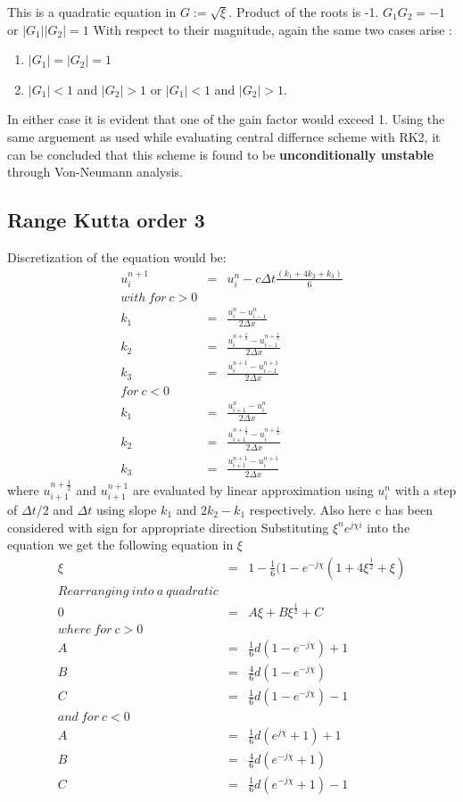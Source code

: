\documentclass[a4paper,12pt]{report}
\begin{document}
This is a quadratic equation in $G := \sqrt{\xi}$. Product of the roots is -1. \newline
$G_1G_2 = -1$ or $|G_1||G_2| = 1$
With respect to their magnitude, again the same two cases arise :
\begin{enumerate}
\item $|G_1|=|G_2|=1$
\item $|G_1|<1$ and $|G_2|> 1$ or $|G_1|<1$ and $|G_2|> 1$. 
\end{enumerate}
In either case it is evident that one of the gain factor would exceed 1. Using the same arguement as used while evaluating central differnce scheme with RK2, it can be concluded that this scheme is found to be \textbf{unconditionally unstable}  through Von-Neumann analysis. 
\subsection{Range Kutta order 3}
Discretization of the equation would be:
\begin{eqnarray}
u^{n+1}_{i} &=& u^{n}_{i} - c\Delta t \frac{(k_1+4k_2+k_3)}{6}
\\with\ for\ c>0 \nonumber\\
k_1 &=& \frac{u_{i}^{n} -u_{i-1}^{n}}{2\Delta x} \nonumber \\
k_2 &=& \frac{u_{i}^{n+\frac{1}{2}} -u_{i-1}^{n+\frac{1}{2}}}{2\Delta x} \nonumber\\
k_3 &=& \frac{u_{i}^{n+1} -u_{i-1}^{n+1}}{2\Delta x} \nonumber\\
for\ c<0 \nonumber\\
k_1 &=& \frac{u_{i+1}^{n} -u_{i}^{n}}{2\Delta x} \nonumber \\
k_2 &=& \frac{u_{i+1}^{n+\frac{1}{2}} -u_{i}^{n+\frac{1}{2}}}{2\Delta x} \nonumber\\
k_3 &=& \frac{u_{i+1}^{n+1} -u_{i}^{n+1}}{2\Delta x} \nonumber
\end{eqnarray}
where $u_{i+1}^{n+\frac{1}{2}}$ and $u_{i+1}^{n+1}$ are evaluated by linear approximation using $u^{n}_{i}$ with a step of $\Delta t/2$ and $\Delta t$ using slope $k_1$ and $2k_2-k_1$ respectively. Also here c has been considered with sign for appropriate direction
Substituting $\xi^{n}e^{j\chi i}$ into the equation we get the following equation in $\xi$
\begin{eqnarray}
\xi &=& 1- \frac{1}{6}(1-e^{-j\chi}(1+4\xi^\frac{1}{2} +\xi)\nonumber \\
Rearranging\ into\ a\ quadratic \nonumber \\
0 &=& A\xi+B\xi^{\frac{1}{2}} + C \label{uprk3}\\
where\ for\ c>0 \nonumber\\
A &=& \frac{1}{6}d(1-e^{-j\chi})+1  \nonumber\\
B &=& \frac{4}{6}d(1-e^{-j\chi}) \nonumber\\
C &=& \frac{1}{6}d(1-e^{-j\chi}) - 1 \nonumber \\
and\ for\ c<0 \nonumber\\
A &=& \frac{1}{6}d(e^{j\chi}+1)+1  \nonumber\\
B &=& \frac{4}{6}d(e^{-j\chi}+1) \nonumber\\
C &=& \frac{1}{6}d(e^{-j\chi}+1) - 1 \nonumber
\end{eqnarray}
\end{document}
